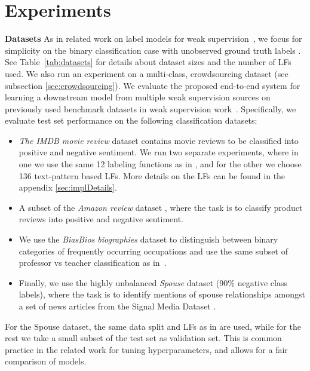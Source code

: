 \documentclass{article}
\begin{document}
\section{Experiments}
\label{Experiments}
\textbf{Datasets} 
As in related work on label models for weak supervision~\cite{DP, Multitask, triplets, TripletsMean}, we focus for simplicity on the binary classification case with unobserved ground truth labels .
See Table~\ref{tab:datasets} for details about dataset sizes and the number of LFs used.
We also run an experiment on a multi-class, crowdsourcing dataset (see subsection \ref{sec:crowdsourcing}).
We evaluate the proposed end-to-end system for learning a downstream model from multiple weak supervision sources on previously used benchmark datasets in weak supervision work~\cite{Snorkel, IWS, TripletsMean}.   Specifically, we evaluate test set performance on the following classification datasets:

\begin{itemize}
    \item 
    \textit{The IMDB movie review} dataset \cite{IMDB} contains  movie reviews to be classified into positive and negative sentiment. We run two separate experiments, where in one we use the same 12 labeling functions as in \cite{TripletsMean}, and for the other we choose 136 text-pattern based LFs. More details on the LFs can be found in the appendix \ref{sec:implDetails}.
    \item
    A subset of the \textit{Amazon review} dataset \cite{Amazon}, where the task is to classify product reviews into positive and negative sentiment.
    \item
    We use the \textit{BiasBios biographies} dataset \cite{biasBios} to distinguish between binary categories of frequently occurring occupations and use the same subset of professor vs teacher classification as in~\cite{IWS}.
    \item
    Finally, we use the highly unbalanced \textit{Spouse} dataset (90\% negative class labels), where the task is to identify mentions of spouse relationships amongst a set of news articles from the Signal Media Dataset \cite{Spouses}.
\end{itemize}
For the Spouse dataset, the same data split and LFs as in \cite{triplets} are used, while for the rest we take a small subset of the 
test set as validation set. This is common practice in the related work \cite{Snorkel, Multitask, triplets, IWS} for tuning hyperparameters, and allows for a fair comparison of models.
\end{document}
